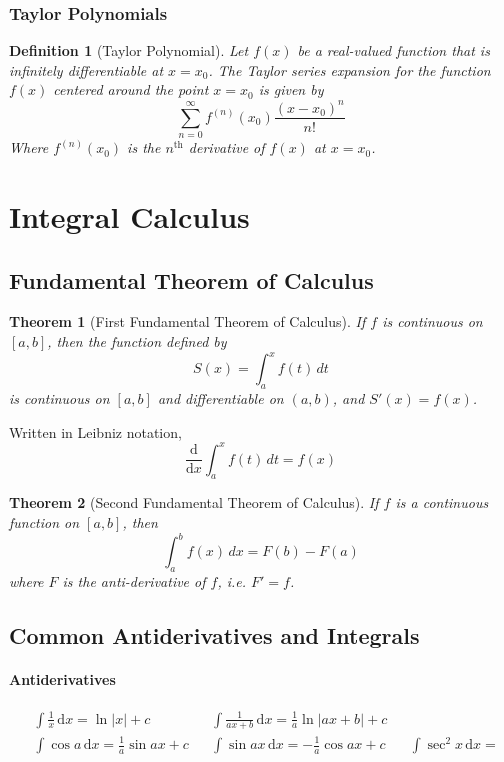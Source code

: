 \documentclass[12pt]{article}
\newcommand{\diff}[1]{\frac{\mathrm{d}}{\mathrm{d}#1}}
\newcommand{\der}[1]{\, \mathrm{d}#1}
\newtheorem{thrm}{Theorem}
\newtheorem{defn}{Definition}
\begin{document}
\subsubsection{Taylor Polynomials}
\begin{defn}[Taylor Polynomial]
\label{taylorpoly}
Let $f(x)$ be a real-valued function that is infinitely differentiable at $x = x_0$. The Taylor series expansion for the function $f(x)$ centered around the point $x = x_0$ is given by
$$\sum_{n=0}^{\infty}f^{(n)}(x_0)\frac{(x - x_0)^{n}}{n!}$$
Where $f^{(n)}(x_0)$ is the $n^\text{th}$ derivative of $f(x)$ at $x = x_0$.
\end{defn}



\section{Integral Calculus}
\subsection{Fundamental Theorem of Calculus}
\begin{thrm}[First Fundamental Theorem of Calculus]
	\label{ftc}
	If $f$ is continuous on $[a,b]$, then the function defined by
	$$S(x)=\int _{ a }^{ x }{ f(t)\, dt }$$
	is continuous on $[a,b]$ and differentiable on $(a,b)$, and $S'(x)=f(x)$.
\end{thrm}
Written in Leibniz notation,
$$\diff{x}\int_{a}^{x} f(t)\, dt = f(x)$$

\begin{thrm}[Second Fundamental Theorem of Calculus]
	If $f$ is a continuous function on $[a,b]$, then	
	$$\int _{ a }^{ b }{ f(x)\, dx=F(b)-F(a)}$$
	where $F$ is the anti-derivative of $f$, i.e. $F'=f$.
\end{thrm}
\subsection{Common Antiderivatives and Integrals}
\paragraph{Antiderivatives}
\begin{align*}
&\int\frac{1}{x}\der{x} = \ln|x| + c & &\int{\frac{1}{ax + b}\der{x}} = \frac{1}{a}\ln|ax+b| + c \\
&\int \cos a \der{x}= \frac1a \sin ax + c & &\int \sin ax\der{x}= - \frac1a \cos ax + c  &  &\int \sec^2x \der{x} = 
\end{align*}
\end{document}
